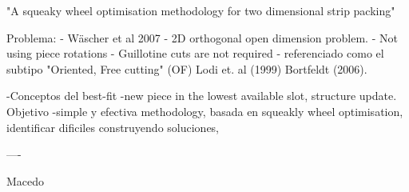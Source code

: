 "A squeaky wheel optimisation methodology for two dimensional strip packing"

Problema:
    - Wäscher et al 2007
    - 2D orthogonal open dimension problem.
    - Not using piece rotations
    - Guillotine cuts are not required
    - referenciado como el subtipo "Oriented, Free cutting" (OF)    Lodi et. al (1999) Bortfeldt (2006).

    -Conceptos del best-fit
        -new piece in the lowest available slot, structure update.
Objetivo
    -simple y efectiva methodology, basada en squeakly wheel optimisation,
        identificar dificiles construyendo soluciones,

----

Macedo


